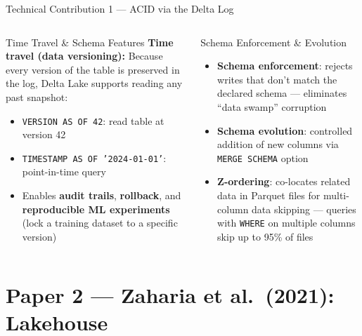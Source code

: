 \documentclass[aspectratio=169,10pt]{beamer}
\begin{document}
\begin{frame}{Technical Contribution 1 — ACID via the Delta Log}
\begin{columns}[T]
      \begin{block}{Time Travel \& Schema Features}
        \textbf{Time travel (data versioning):}
        Because every version of the table is preserved in the
        log, Delta Lake supports reading any past snapshot:
        \begin{itemize}
          \item \texttt{VERSION AS OF 42}: read table at version 42
          \item \texttt{TIMESTAMP AS OF '2024-01-01'}:
                point-in-time query
          \item Enables \textbf{audit trails}, \textbf{rollback},
                and \textbf{reproducible ML experiments}
                (lock a training dataset to a specific version)
        \end{itemize}
      \end{block}
      \vspace{4pt}
      \begin{exampleblock}{Schema Enforcement \& Evolution}
        \begin{itemize}
          \item \textbf{Schema enforcement}: rejects writes that
                don't match the declared schema —
                eliminates ``data swamp'' corruption
          \item \textbf{Schema evolution}: controlled addition of
                new columns via \texttt{MERGE SCHEMA} option
          \item \textbf{Z-ordering}: co-locates related data in
                Parquet files for multi-column data skipping —
                queries with \texttt{WHERE} on multiple columns
                skip up to 95\% of files
        \end{itemize}
      \end{exampleblock}
  \end{columns}
\end{frame}

\section{Paper 2 — Zaharia et al.\ (2021): Lakehouse}
\end{document}
